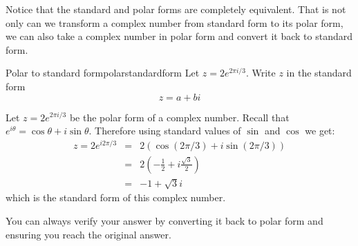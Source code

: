 Notice that the standard and polar forms are completely equivalent. That is not only can we transform a complex number from standard form
to its polar form, we can also take a complex number in polar form and
convert it back to standard form.

\begin{example}{Polar to standard form}{polarstandardform}
Let $z = 2 e^{ 2\pi i/3}$. Write $z$ in the standard form 
\begin{equation*}
z = a+bi
\end{equation*}
\end{example}

\begin{solution}
Let $z = 2 e^{2\pi i/3}$ be the polar form of a complex number. Recall that 
$e^{i\theta} = \cos \theta + i \sin \theta$. Therefore using standard values of $\sin$ and $\cos$ we get:
\begin{eqnarray*}
z = 2 e^{i 2\pi/3} &=& 2 (\cos (2\pi/3)+i\sin (2\pi/3))\\
&=& 2 \left ( -\frac{1}{2} + i \frac{\sqrt{3}}{2} \right) \\
&=&-1 + \sqrt{3}i 
\end{eqnarray*}
which is the standard form of this complex number.
\end{solution}

You can always verify your answer by converting it back to polar form and ensuring you reach the original answer. 
